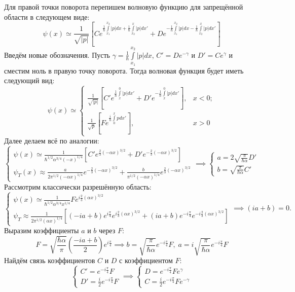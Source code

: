 Для правой точки поворота перепишем волновую функцию для запрещённой области в следующем виде:
\[
\psi(x) \simeq \frac{1}{\sqrt{|p|}} \left[ Ce^{\frac{1}{\hbar}\int\limits_{x_1}^{x_2} |p| dx + \frac{1}{\hbar}\int\limits_{x_2}^{x} |p| dx'} + De^{-\frac{1}{\hbar}\int\limits_{x_1}^{x_2} |p| dx - \frac{1}{\hbar}\int\limits_{x_2}^{x} |p| dx'} \right]
\]
Введём новые обозначения. Пусть $\gamma = \frac{1}{\hbar}\int\limits_{x_1}^{x_2} |p| dx$, $C' = De^{-\gamma}$ и $D' = Ce^{\gamma}$ и сместим ноль в правую точку поворота. Тогда волновая функция будет иметь следующий вид:
\[
   \psi(x) \simeq 
   \begin{cases}
   \frac{1}{\sqrt{|p|}}\left[ C'e^{\frac{1}{\hbar}\int\limits_{x}^{0} |p| dx'} + D'e^{-\frac{1}{\hbar}\int\limits_{x}^{0} |p| dx'} \right], & x < 0;\\
   \frac{1}{\sqrt{p}}\left[ Fe^{\frac{i}{\hbar}\int\limits_{0}^{x} p dx'} \right], & x > 0
   \end{cases}
\]
Далее делаем всё по аналогии:
\[
\begin{cases}
    \psi(x) \simeq \frac{1}{\hbar^{1/2}\alpha^{3/4}(-x)^{1/4}}\left[ C'e^{\frac{2}{3}(-\alpha x)^{3/2}} + D'e^{-\frac{2}{3}(-\alpha x)^{3/2}} \right]\\
    \psi_T(x) \approx \frac{a}{2\pi^{1/2}(-\alpha x)^{1/4}}e^{-\frac{2}{3}(-\alpha x)^{3/2}} + \frac{b}{\pi^{1/2}(-\alpha x)^{1/4}}e^{\frac{2}{3}(-\alpha x)^{3/2}}
\end{cases}
 \implies
 \begin{cases}
     a = 2\sqrt{\frac{\pi}{\hbar\alpha}}D'\\
     b = \sqrt{\frac{\pi}{\hbar\alpha}}C'
 \end{cases}
\]
Рассмотрим классически разрешённую область:
\[
\begin{cases}
    \psi(x) \simeq \frac{1}{\hbar^{1/2}\alpha^{3/4}x^{1/4}}Fe^{i\frac{2}{3}(\alpha x)^{3/2}}\\
    \psi_T \approx \frac{1}{2\pi^{1/2}(\alpha x)^{1/4}}\left[ (-ia + b)e^{i\frac{\pi}{4}}e^{i\frac{2}{3}(\alpha x)^{3/2}} + (ia+b)e^{-i\frac{\pi}{4}}e^{-i\frac{2}{3}(\alpha x)^{3/2}} \right]
\end{cases}
 \implies (ia + b) = 0.
\]
Выразим коэффициенты $a$ и $b$ через $F$:
\[
F = \sqrt{\frac{\hbar\alpha}{\pi}}\left( \frac{-ia + b}{2} \right)e^{i\frac{\pi}{4}} \implies b = \sqrt{\frac{\pi}{\hbar\alpha}} e^{-i\frac{\pi}{4}}F, \; a = i\sqrt{\frac{\pi}{\hbar\alpha}} e^{-i\frac{\pi}{4}}F
\]
Найдём связь коэффициентов $C$ и $D$ с коэффициентом $F$:
\[
\begin{cases}
    C' = e^{-i\frac{\pi}{4}}F\\
    D' = \frac{i}{2}e^{-i\frac{\pi}{4}}F
\end{cases}
\implies
\begin{cases}
    D = e^{-i\frac{\pi}{4}}Fe^{\gamma}\\
    C = \frac{i}{2}e^{-i\frac{\pi}{4}}Fe^{-\gamma}
\end{cases}
\]

